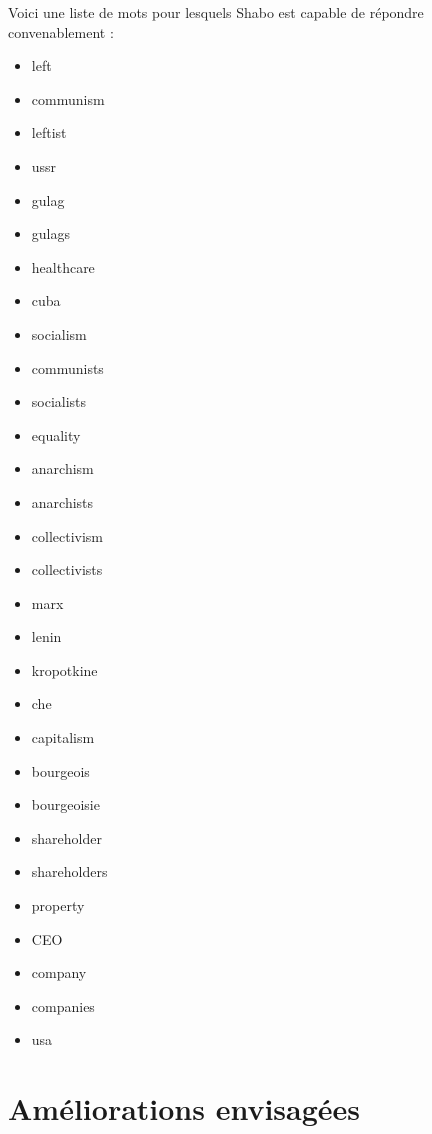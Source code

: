 \documentclass[paper=a4]{article}
\begin{document}
Voici une liste de mots pour lesquels Shabo est capable de répondre
convenablement :
\begin{multicols}{4} %
    \begin{itemize}
        \item left
        \item communism
        \item leftist
        \item ussr
        \item gulag
        \item gulags
        \item healthcare
        \item cuba
        \item socialism
        \item communists
        \item socialists
        \item equality
        \item anarchism
        \item anarchists
        \item collectivism
        \item collectivists
        \item marx
        \item lenin
        \item kropotkine
        \item che
        \item capitalism
        \item bourgeois
        \item bourgeoisie
        \item shareholder
        \item shareholders
        \item property
        \item CEO
        \item company
        \item companies
        \item usa
    \end{itemize}
\end{multicols}



\section{Améliorations envisagées}
\end{document}
